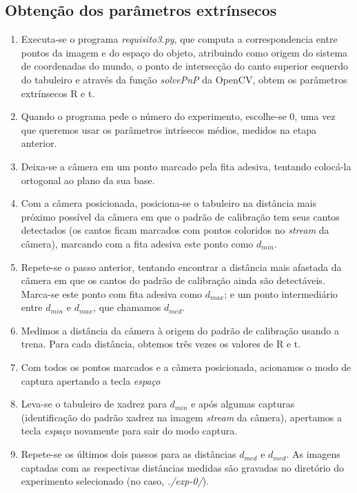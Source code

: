 \documentclass[conference]{IEEEtran}
\begin{document}
\subsection{Obtenção dos parâmetros extrínsecos}
\begin{enumerate}
\item Executa-se o programa \textit{requisito3.py}, que computa a correspondencia entre pontos da imagem e do espaço do objeto, atribuindo como origem do sistema de coordenadas do mundo, o ponto de intersecção do canto superior esquerdo do tabuleiro e através da função \textit{solvePnP} da OpenCV\cite{OpenCV}, obtem os parâmetros extrínsecos R e t. 
\item Quando o programa pede o número do experimento, escolhe-se \(0\), uma vez que queremos usar os parâmetros intrísecos médios, medidos na etapa anterior.

\item Deixa-se a câmera em um ponto marcado pela fita adesiva, tentando colocá-la ortogonal ao plano da sua base. 
\item Com a câmera posicionada, posiciona-se o tabuleiro na distância mais próximo possível da câmera em que o padrão de calibração tem seus cantos detectados (os cantos ficam marcados com pontos coloridos no \textit{stream} da câmera), marcando com a fita adesiva este ponto como \(d_{min}\). 
\item Repete-se o passo anterior, tentando encontrar a distância mais afastada da câmera em que os cantos do padrão de calibração ainda são detectáveis. Marca-se este ponto com fita adesiva como \(d_{max}\); e um ponto intermediário entre \(d_{min}\) e \(d_{max}\), que chamamos \(d_{med}\).
\item Medimos a distância da câmera à origem do padrão de calibração usando a trena. Para cada distância, obtemos três vezes os valores de R e t.
\item Com todos os pontos marcados e a câmera posicionada, acionamos o modo de captura apertando a tecla \textit{espaço}
\item Leva-se o tabuleiro de xadrez para \(d_{min}\) e após algumas capturas (identificação do padrão xadrez na imagem \textit{stream} da câmera), apertamos a tecla \textit{espaço} novamente para sair do modo captura.
\item Repete-se os últimos dois passos para as distâncias \(d_{med}\) e \(d_{med}\). As imagens captadas com as respectivas distâncias medidas são gravadas no diretório do experimento selecionado (no caso, \textit{./exp-0/}). 
\end{enumerate}
\end{document}
